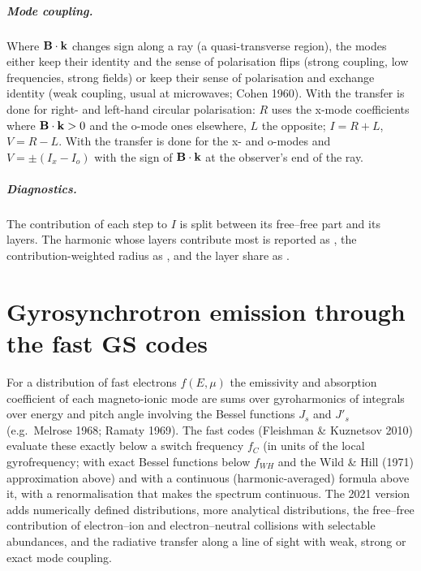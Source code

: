 \paragraph{Mode coupling.} Where $\mathbf{B}\cdot\mathbf{k}$ changes sign along a ray (a
quasi-transverse region), the modes either keep their identity and the sense of
polarisation flips (strong coupling, low frequencies, strong fields) or keep their sense
of polarisation and exchange identity (weak coupling, usual at microwaves; Cohen 1960).
With  the transfer is done for right- and left-hand circular
polarisation: $R$ uses the x-mode coefficients where $\mathbf{B}\cdot\mathbf{k}>0$ and the
o-mode ones elsewhere, $L$ the opposite; $I=R+L$, $V=R-L$. With 
the transfer is done for the x- and o-modes and $V=\pm(I_x-I_o)$ with the sign of
$\mathbf{B}\cdot\mathbf{k}$ at the observer's end of the ray.

\paragraph{Diagnostics.} The contribution of each step to $I$ is split between its
free--free part and its layers. The harmonic whose layers contribute most is reported as
, the contribution-weighted radius as , and the layer share
as .

\chapter{Gyrosynchrotron emission through the fast GS codes}\label{chap:gstheory}

For a distribution of fast electrons $f(E,\mu)$ the emissivity and absorption coefficient
of each magneto-ionic mode are sums over gyroharmonics of integrals over energy and pitch
angle involving the Bessel functions $J_s$ and $J'_s$ (e.g.\ Melrose 1968; Ramaty 1969).
The fast codes (Fleishman \& Kuznetsov 2010) evaluate these exactly below a switch
frequency $f_C$ (in units of the local gyrofrequency; with exact Bessel functions below
$f_{WH}$ and the Wild \& Hill (1971) approximation above) and with a continuous
(harmonic-averaged) formula above it, with a renormalisation that makes the spectrum
continuous. The 2021 version adds numerically defined distributions, more analytical
distributions, the free--free contribution of electron--ion and electron--neutral
collisions with selectable abundances, and the radiative transfer along a line of sight
with weak, strong or exact mode coupling.

